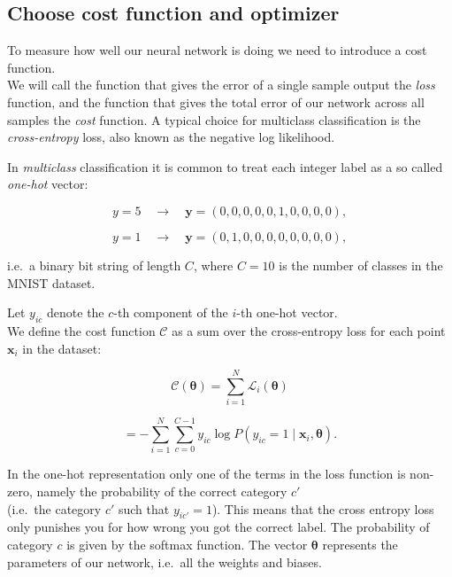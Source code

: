 \documentclass[11pt]{article}
\begin{document}
    \hypertarget{choose-cost-function-and-optimizer}{%
\subsection{Choose cost function and
optimizer}\label{choose-cost-function-and-optimizer}}

To measure how well our neural network is doing we need to introduce a
cost function.\\
We will call the function that gives the error of a single sample output
the \emph{loss} function, and the function that gives the total error of
our network across all samples the \emph{cost} function. A typical
choice for multiclass classification is the \emph{cross-entropy} loss,
also known as the negative log likelihood.

In \emph{multiclass} classification it is common to treat each integer
label as a so called \emph{one-hot} vector:

\[ y = 5 \quad \rightarrow \quad \boldsymbol{y} = (0, 0, 0, 0, 0, 1, 0, 0, 0, 0) ,\]

\[ y = 1 \quad \rightarrow \quad \boldsymbol{y} = (0, 1, 0, 0, 0, 0, 0, 0, 0, 0) ,\]

i.e.~a binary bit string of length \(C\), where \(C = 10\) is the number
of classes in the MNIST dataset.

Let \(y_{ic}\) denote the \(c\)-th component of the \(i\)-th one-hot
vector.\\
We define the cost function \(\mathcal{C}\) as a sum over the
cross-entropy loss for each point \(\boldsymbol{x}_i\) in the dataset:

    \hypertarget{_auto11}{}

\[
\begin{equation} \mathcal{C}(\boldsymbol{\theta}) = \sum_{i=1}^N \mathcal{L}_i (\boldsymbol{\theta}) 
\label{_auto11} \tag{16}
\end{equation}
\]

    \hypertarget{_auto12}{}

\[
\begin{equation} 
 = -\sum_{i=1}^N \sum_{c=0}^{C-1} y_{ic} \log P(y_{ic} = 1 \mid \boldsymbol{x}_i, \boldsymbol{\theta}) .
\label{_auto12} \tag{17}
\end{equation}
\]

    In the one-hot representation only one of the terms in the loss function
is non-zero, namely the probability of the correct category \(c'\)\\
(i.e.~the category \(c'\) such that \(y_{ic'} = 1\)). This means that
the cross entropy loss only punishes you for how wrong you got the
correct label. The probability of category \(c\) is given by the softmax
function. The vector \(\boldsymbol{\theta}\) represents the parameters
of our network, i.e.~all the weights and biases.
\end{document}
